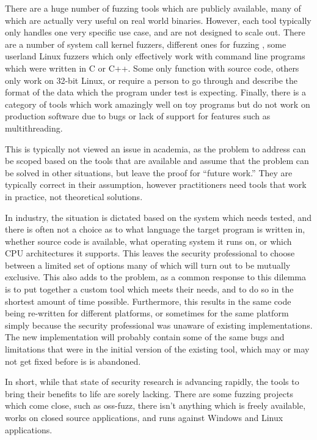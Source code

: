 There are a huge number of fuzzing tools which are publicly available, many of
which are actually very useful on real world binaries.  However, each tool
typically only handles one very specific use case, and are not designed to scale
out.  There are a number of system call kernel fuzzers, different ones for
fuzzing \IOCTLs{}, some userland Linux fuzzers which only effectively work with
command line programs which were written in C or C++.  Some only function with
source code, others only work on 32-bit Linux, or require a person to go
through and describe the format of the data which the program under test is
expecting.  Finally, there is a category of tools which work amazingly well
on toy programs but do not work on production software due to bugs or lack of
support for features such as multithreading.

This is typically not viewed an issue in academia, as the problem to address can be
scoped based on the tools that are available and assume that the problem can
be solved in other situations, but leave the proof for ``future work.''  They
are typically correct in their assumption, however practitioners need tools
that work in practice, not theoretical solutions.

In industry, the situation is dictated based on the system which needs tested,
and there is often not a choice as to what language the target program is
written in, whether source code is available, what operating system it runs
on, or which CPU architectures it supports. This leaves the security
professional to choose between a limited set of options many of which will
turn out to be mutually exclusive. This also adds to the problem, as a common
response to this dilemma is to put together a custom tool which meets their
needs, and to do so in the shortest amount of time possible.  Furthermore,
this results in the same code being re-written for different platforms, or
sometimes for the same platform simply because the security professional was
unaware of existing implementations.  The new implementation will probably
contain some of the same bugs and limitations that were in the initial
version of the existing tool, which may or may not get fixed before is is
abandoned.

In short, while that state of security research is advancing rapidly, the
tools to bring their benefits to life are sorely lacking.  There are some
fuzzing projects which come close, such as oss-fuzz,\cite{ossfuzz} there
isn't anything which is freely available, works on closed source applications,
and runs against Windows and Linux applications.
